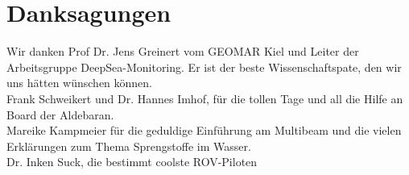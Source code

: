  

\chapter[Danksagungen]{Danksagungen}
Wir danken Prof Dr. Jens Greinert vom GEOMAR Kiel und Leiter der Arbeitsgruppe DeepSea-Monitoring. Er ist der beste Wissenschaftspate, den wir uns hätten wünschen können.\\
Frank Schweikert und Dr. Hannes Imhof, für die tollen Tage und all die Hilfe an Board der Aldebaran. \\
Mareike Kampmeier für die geduldige Einführung am Multibeam und die vielen Erklärungen zum Thema Sprengstoffe im Wasser. \\
Dr. Inken Suck, die bestimmt coolste ROV-Piloten




